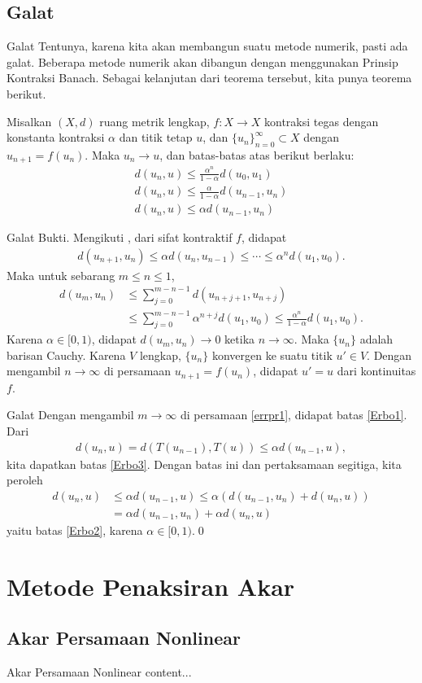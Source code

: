 \documentclass[xcolor={dvipsnames}, 9pt]{beamer}
\begin{document}
	\subsection{Galat}
	\begin{frame}{Galat}
		Tentunya, karena kita akan membangun suatu metode numerik, pasti ada galat. Beberapa metode numerik akan dibangun dengan menggunakan Prinsip Kontraksi Banach. Sebagai kelanjutan dari teorema tersebut, kita punya teorema berikut.
		\begin{theorem}
			Misalkan $(X,d)$ ruang metrik lengkap, $f:X\to X$ kontraksi tegas dengan konstanta kontraksi $\alpha$ dan titik tetap $u$, dan $\{u_n\}_{n=0}^\infty\subset X$ dengan $u_{n+1} = f(u_n)$. Maka $u_n\to u$, dan batas-batas atas berikut berlaku:
			\begin{align}
				d(u_n,u)\leq\frac{\alpha^n}{1-\alpha}d(u_0,u_1)\label{Erbo1} \\
				d(u_n,u)\leq\frac{\alpha}{1-\alpha}d(u_{n-1},u_n)\label{Erbo2} \\
				d(u_n,u)\leq\alpha d(u_{n-1},u_n)\label{Erbo3}
			\end{align}
		\end{theorem}
	\end{frame}
	\begin{frame}{Galat}
		Bukti. Mengikuti \cite{Han2009Theoretical}, dari sifat kontraktif $f$, didapat
		\begin{align*}
			d(u_{n+1},u_n)\leq\alpha d(u_n,u_{n-1})\leq\cdots\leq\alpha^nd(u_1,u_0).
		\end{align*}
		Maka untuk sebarang $m\leq n\leq 1$,
		\begin{align}
			d(u_m,u_n)&\leq\sum_{j=0}^{m-n-1}d(u_{n+j+1},u_{n+j}) \nonumber\\
			&\leq\sum_{j=0}^{m-n-1}\alpha^{n+j}d(u_1,u_0)\leq\frac{\alpha^n}{1-\alpha}d(u_1,u_0)\label{errpr1}.
		\end{align}
		Karena $\alpha\in[0,1)$, didapat $d(u_m,u_n)\to 0$ ketika $n\to\infty$. Maka $\{u_n\}$ adalah barisan Cauchy. Karena $V$ lengkap, $\{u_n\}$ konvergen ke suatu titik $u'\in V$. Dengan mengambil $n\to\infty$ di persamaan $u_{n+1}=f(u_n)$, didapat $u'=u$ dari kontinuitas $f$.
	\end{frame}
	\begin{frame}{Galat}
		Dengan mengambil $m\to\infty$ di persamaan \eqref{errpr1}, didapat batas \eqref{Erbo1}. \newline
		Dari
		\begin{align*}
			d(u_n,u) = d(T(u_{n-1}),T(u)) \leq \alpha d(u_{n-1},u),
		\end{align*}
		kita dapatkan batas \eqref{Erbo3}. Dengan batas ini dan pertaksamaan segitiga, kita peroleh
		\begin{align*}
			d(u_n,u)&\leq \alpha d(u_{n-1},u)\leq \alpha(d(u_{n-1},u_n)+d(u_n,u))\\
			&=\alpha d(u_{n-1},u_n)+\alpha d(u_n,u)
		\end{align*}
		yaitu batas \eqref{Erbo2}, karena $\alpha\in[0,1)$.\qed
	\end{frame}
	\section{Metode Penaksiran Akar}
	\subsection{Akar Persamaan Nonlinear}
	\begin{frame}{Akar Persamaan Nonlinear}
		content...
	\end{frame}
\end{document}
